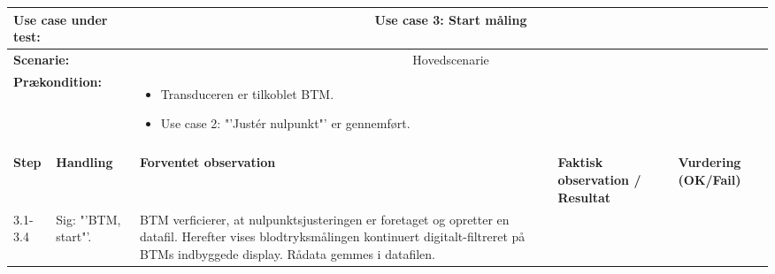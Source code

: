 \begin{tabular}{|p{1cm}|p{3cm}|p{4cm}|p{4cm}|p{2cm}|}
\hline
\multicolumn{2}{|p{3cm}|}{\textbf{Use case under test:}} & \multicolumn{3}{c|}{Use case 3: Start måling} \\\hline

\multicolumn{2}{|p{3cm}|}{\textbf{Scenarie:}} & \multicolumn{3}{c|}{Hovedscenarie} \\\hline

\multicolumn{2}{|p{3cm}|}{\textbf{Prækondition:}}  & \multicolumn{3}{l|}{\parbox{0.6\textwidth}{
\begin{itemize}[label=$\circ$]
\item Transduceren er tilkoblet BTM.
\item Use case 2: "'Justér nulpunkt"' er gennemført.  
\end{itemize} }}\\\hline

\multicolumn{5}{|c|}{} \\\hline

\textbf{Step} & \textbf{Handling} & \textbf{Forventet observation} & \textbf{Faktisk observation / Resultat} & \textbf{Vurdering (OK/Fail)}\\\hline

3.1-3.4 & Sig: "'BTM, start"'. & BTM verficierer, at nulpunktsjusteringen er foretaget og opretter en datafil. Herefter vises blodtryksmålingen kontinuert digitalt-filtreret på BTMs indbyggede display. Rådata gemmes i datafilen. &  & \\\hline

\end{tabular}




